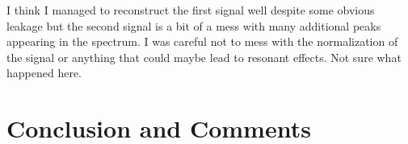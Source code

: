 \documentclass[10pt, titlepage, a4paper]{article}
\begin{document}
I think I managed to reconstruct the first signal well despite some obvious leakage but the second signal is a bit of a mess 
with many additional peaks appearing in the spectrum. I was careful not to mess with the normalization of the signal or anything
that could maybe lead to resonant effects. Not sure what happened here. \\


\section{Conclusion and Comments}

% 
% 

\end{document}

